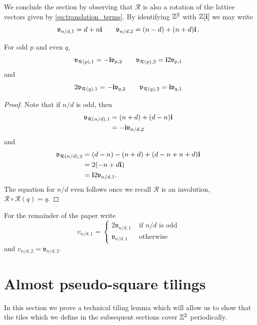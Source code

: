 \documentclass[12pt]{amsart}
\begin{document}
We conclude the section by observing that $\mathcal{R}$ is also a rotation of the lattice vectors given by \eqref{eq:translation_terms}.
By identifying $\mathbb{Z}^2$ with $\mathbb{Z}[\mathbf{i}]$ we may write
\begin{equation}
\mathfrak{v}_{n/d,1} = d  + n \mathbf{i} \qquad \mathfrak{v}_{n/d, 2} = (n-d) + (n+d) \mathbf{i} \, . 
\end{equation}


\begin{lemma} \label{lemma:lattice_rotation}
	For odd $p$ and even $q$, 
	\begin{equation}
	\mathfrak{v}_{\mathcal{R}(p), 1} =  - \mathbf{i} \mathfrak{v}_{p,2} \qquad 	\mathfrak{v}_{\mathcal{R}(p),2} = \mathbf{i} 2 \mathfrak{v}_{p,1} 
	\end{equation}
	and
	\begin{equation}
	2 \mathfrak{v}_{\mathcal{R}(q),1} = -\mathbf{i} \mathfrak{v}_{q,2} \qquad \mathfrak{v}_{\mathcal{R}(q),2} = \mathbf{i} \mathfrak{v}_{q,1}
	\end{equation}
\end{lemma}

\begin{proof}
	Note that if $n/d$ is odd, then
	\begin{align*}
	\mathfrak{v}_{\mathcal{R}(n/d), 1} &= (n+d) + (d-n) \mathbf{i} \\
	&=  - \mathbf{i} \mathfrak{v}_{n/d,2} 
	\end{align*}
	and
	\begin{align*}
	\mathfrak{v}_{\mathcal{R}(n/d), 2} &= (d-n) - (n+d) + ( d- n + n + d) \mathbf{i}  \\
	&= 2( -n + d \mathbf{i}) \\
	&= \mathbf{i} 2 \mathfrak{v}_{n/d,1}.
	\end{align*}
	The equation for $n/d$ even follows once we recall $\mathcal{R}$ is an involution,   $\mathcal{R} \circ \mathcal{R}(q) = q$.
\end{proof}

For the remainder of the paper write 
\begin{equation}
v_{n/d,1} = \begin{cases}
2 \mathfrak{v}_{n/d,1} &\mbox{ if $n/d$ is odd} \\
\mathfrak{v}_{n/d,1} &\mbox{ otherwise}
\end{cases}
\end{equation}
and $v_{n/d,2} = \mathfrak{v}_{n/d,2}$.




\section{Almost pseudo-square tilings} \label{sec:almost_tilings}
In this section we prove a technical tiling lemma which will allow us to show that the tiles which we define in the subsequent sections
cover $\mathbb{Z}^2$ periodically. 
\end{document}
